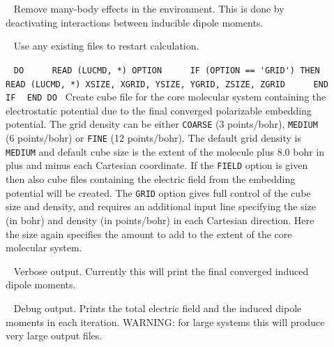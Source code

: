 \begin{description}
\item[]\verb| |\newline
Remove many-body effects in the environment. This is done by deactivating interactions between inducible dipole moments. 

\item[]\verb| |\newline
Use any existing files to restart calculation.

\item[]\verb| |\newline
\verb|DO|\verb| |\newline
\verb|    READ (LUCMD, *) OPTION|\verb| |\newline
\verb|    IF (OPTION == 'GRID') THEN|\verb| |\newline
\verb|       READ (LUCMD, *) XSIZE, XGRID, YSIZE, YGRID, ZSIZE, ZGRID|\verb| |\newline
\verb|    END IF| \verb| |\newline
\verb|END DO|\verb| |\newline
Create cube file for the core molecular system containing the electrostatic potential due to the final converged polarizable embedding potential. The grid density can be either \verb|COARSE| (3 points/bohr), \verb|MEDIUM| (6 points/bohr) or \verb|FINE| (12 points/bohr). The default grid density is \verb|MEDIUM| and default cube size is the extent of the molecule plus 8.0 bohr in plus and minus each Cartesian coordinate. If the \verb|FIELD| option is given then also cube files containing the electric field from the embedding potential will be created. The \verb|GRID| option gives full control of the cube size and density, and requires an additional input line specifying the size (in bohr) and density (in points/bohr) in each Cartesian direction. Here the size again specifies the amount to add to the extent of the core molecular system.

\item[]\verb| |\newline
Verbose output. Currently this will print the final converged induced dipole moments.

\item[]\verb| |\newline
Debug output. Prints the total electric field and the induced dipole moments in each iteration. WARNING: for large systems this will produce very large output files.

\end{description}

